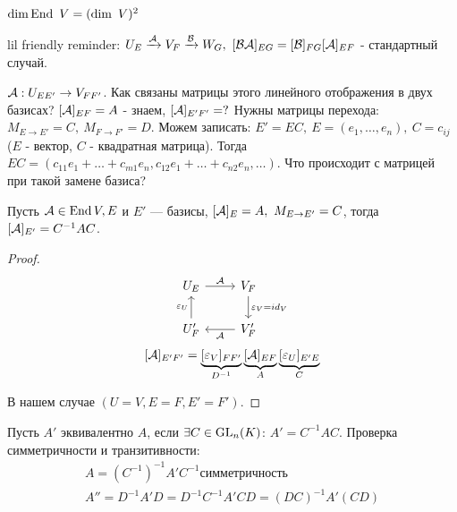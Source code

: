\documentclass[main]{subfiles}
\begin{document}
\begin{corollary}
$\dim \operatorname{End}\ V = (\dim \ V)^2 $
\end{corollary}

lil friendly reminder: $U_E \xrightarrow{\mathcal{A}} V_F \xrightarrow{\mathcal{B}} W_G,\  
[\mathcal{B}\mathcal{A}]_{EG} = [\mathcal{B}]_{FG}[\mathcal{A}]_{EF}
$ - стандартный случай. 
    
$\mathcal{A}: U_{EE'} \rightarrow V_{FF'}$. Как связаны матрицы этого линейного отображения в двух базисах?
$[\mathcal{A}]_{EF}=A$ - знаем,  $[\mathcal{A}]_{E'F'}=?$ Нужны матрицы перехода:
$M_{E\rightarrow E'} = C,\ M_{F\rightarrow F'} = D$. Можем записать:
$E' = EC,\ E=(e_1, \ldots ,e_n),\ C=c_{ij}$ ($E$ - вектор, $C$ - квадратная матрица). Тогда
$EC=(c_{11}e_1+\ldots+c_{m1}e_n, c_{12}e_1 +\ldots +c_{n2}e_n, \ldots)$. Что происходит с матрицей при такой замене базиса?

\begin{proposition} 
    Пусть $\mathcal{A} \in \operatorname{End} V, E$ и $E'$ — базисы, $[\mathcal{A}]_{E}=A,\ M_{E\rightarrow E'}=C$, тогда $[\mathcal{A}]_{E'}=C^{-1}AC$.
\end{proposition}

\begin{proof}
        \[\begin{tikzcd}[ampersand replacement=\&]
            {U_E} \& {V_F} \\
            {U_F'} \& {V_F'}
            \arrow["{\epsilon_V=id_V}", from=1-2, to=2-2]
            \arrow["{\mca}", from=2-2, to=2-1]
            \arrow["{\epsilon_U}", from=2-1, to=1-1]
            \arrow["{\mca}", from=1-1, to=1-2]
        \end{tikzcd}\]
        \[[\mathcal{A}]_{E'F'}=\underbrace{[\varepsilon_V]_{FF'}}_{D^{-1}}\underbrace{[\mathcal{A}]_{EF}}_{A}\underbrace{[\varepsilon_U]_{E'E}}_{C}\]
    
    В нашем случае $(U=V, E=F, E'=F')$.
\end{proof}

\begin{definition} [Алгебра]
    Пусть $A'$ эквивалентно $A$, если $\exists C \in \operatorname{GL}_n(K)$: $A'=C^{-1}AC$. 
    Проверка симметричности и транзитивности:
    \begin{gather*} 
        A= (C^{-1})^{-1}A'C^{-1} симметричность \\
        A'' = D^{-1}A'D=D^{-1}C^{-1}A'CD=(DC)^{-1}A'(CD)  \\
    \end{gather*}
\end{definition}

 
\end{document}

